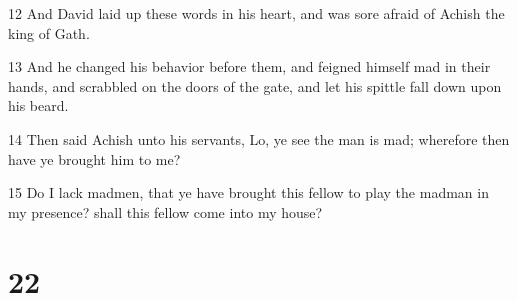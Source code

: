 \par 12 And David laid up these words in his heart, and was sore afraid of Achish the king of Gath.
\par 13 And he changed his behavior before them, and feigned himself mad in their hands, and scrabbled on the doors of the gate, and let his spittle fall down upon his beard.
\par 14 Then said Achish unto his servants, Lo, ye see the man is mad; wherefore then have ye brought him to me?
\par 15 Do I lack madmen, that ye have brought this fellow to play the madman in my presence? shall this fellow come into my house?

\chapter{22}

